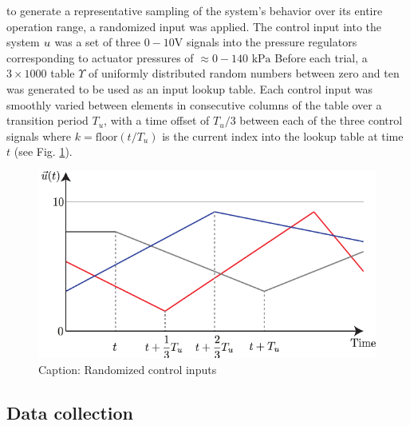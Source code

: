 to generate a representative sampling of the system's behavior over its entire operation range, a randomized input was applied.
The control input into the system $u$ was a set of three $0-10 \text{V}$  signals into the pressure regulators corresponding to actuator pressures of $\approx 0-140 \text{ kPa}$
Before each trial, a $3 \times 1000$ table $\Upsilon$ of uniformly distributed random numbers between zero and ten was generated to be used as an input lookup table.
Each control input was smoothly varied between elements in consecutive columns of the table over a transition period $T_u$, with a time offset of $T_u / 3$ between each of the three control signals
where $k = \text{floor}\left( {t} / {T_u} \right)$ is the current index into the lookup table at time $t$ (see Fig. \ref{fig:randInput}).

\begin{figure}
    \centering
    \includegraphics[width=\linewidth]{figures/randInput3dim.pdf}
    \caption{Caption: Randomized control inputs}
    \label{fig:randInput}
\end{figure}


\subsection{Data collection}

